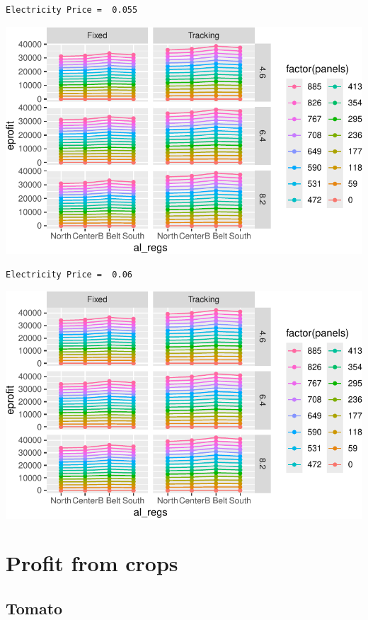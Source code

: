 \documentclass[
  letterpaper,
  DIV=11,
  numbers=noendperiod]{scrartcl}
\begin{document}
\begin{verbatim}
Electricity Price =  0.055
\end{verbatim}

\includegraphics{Simulation_files/figure-pdf/unnamed-chunk-25-10.pdf}

\begin{verbatim}
Electricity Price =  0.06
\end{verbatim}

\includegraphics{Simulation_files/figure-pdf/unnamed-chunk-25-11.pdf}

\section{Profit from crops}\label{profit-from-crops}

\subsection{Tomato}\label{tomato-1}
\end{document}
